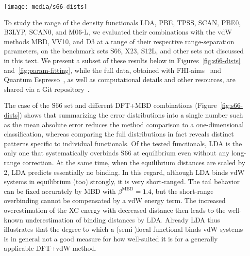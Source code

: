 \begin{figure*}[t]
\texttt{[image: media/s66-dists]}
\caption{\textbf{Distributions of relative errors in binding energies on the S66 set of several DFT+MBD combinations.}
The distributions are displayed as box-and-whisker plots: a box shows the quartiles and whiskers represent the rest of the distribution, except for outliers that are more than 2.5-fold the interquartile distance from the box, which are shown individually.
The $x$-axis labels denote the functional and the value of the MBD range-separation parameter, $\beta^\text{MBD}$.
The blue--red spectrum encodes the scaling, $q$, of the respective equilibrium distances of individual complexes.
The green numbers indicate the mean absolute error (kcal/mol) for $q=1$.
The values of $\beta^\text{MBD}$ were selected as follows: $\beta$-values shown for PBE, PBE0, B3LYP, SCAN* (see text), and M06-L optimize MARE around $q=1$; $\beta=1.4$ for LDA optimizes MARE for $q=2$; and for SCAN and all $q$, $\beta=1.09$ optimizes SDRE, and $\beta=1.16$ optimizes MRE\@.
}\label{fig:s66-dists}
\end{figure*}

To study the range of the density functionals LDA, PBE, TPSS, SCAN, PBE0, B3LYP, SCAN0, and M06-L, we evaluated their combinations with the vdW methods MBD, VV10, and D3 at a range of their respective range-separation parameters, on the benchmark sets S66, X23, S12L, and other sets not discussed in this text.
We present a subset of these results below in Figures~\ref{fig:s66-dists} and~\ref{fig:param-fitting}, while the full data, obtained with FHI-aims~\cite{BlumCPC09} and Quantum Espresso~\cite{GiannozziJPCM09,HamannPRB13}, as well as computational details and other resources, are shared via a Git repository~\cite{GitRepo}.

The case of the S66 set and different DFT+MBD combinations (Figure~\ref{fig:s66-dists}) shows that summarizing the error distributions into a single number such as the mean absolute error reduces the method comparison to a one-dimensional classification, whereas comparing the full distributions in fact reveals distinct patterns specific to individual functionals.
Of the tested functionals, LDA is the only one that systematically overbinds S66 at equilibrium even without any long-range correction.
At the same time, when the equilibrium distances are scaled by 2, LDA predicts essentially no binding.
In this regard, although LDA binds vdW systems in equilibrium (too) strongly, it is very short-ranged.
The tail behavior can be fixed accurately by MBD with $\beta^\text{MBD}=1.4$, but the short-range overbinding cannot be compensated by a vdW energy term.
The increased overestimation of the XC energy with decreased distance then leads to the well-known underestimation of binding distances by LDA\@.
Already LDA thus illustrates that the degree to which a (semi-)local functional binds vdW systems is in general not a good measure for how well-suited it is for a generally applicable DFT+vdW method. %

